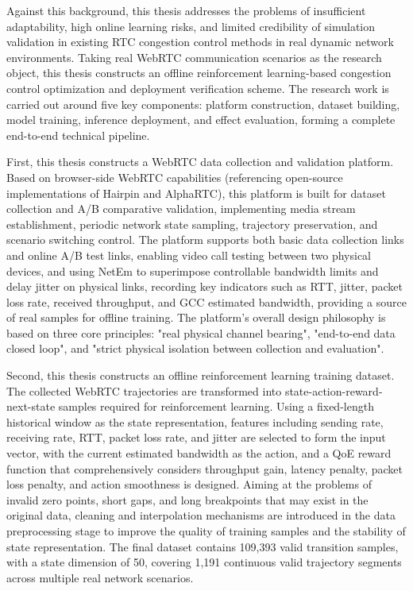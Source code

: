 {Against this background, this thesis addresses the problems of insufficient adaptability, high online learning risks, and limited credibility of simulation validation in existing RTC congestion control methods in real dynamic network environments. Taking real WebRTC communication scenarios as the research object, this thesis constructs an offline reinforcement learning-based congestion control optimization and deployment verification scheme. The research work is carried out around five key components: platform construction, dataset building, model training, inference deployment, and effect evaluation, forming a complete end-to-end technical pipeline.

First, this thesis constructs a WebRTC data collection and validation platform. Based on browser-side WebRTC capabilities (referencing open-source implementations of Hairpin and AlphaRTC), this platform is built for dataset collection and A/B comparative validation, implementing media stream establishment, periodic network state sampling, trajectory preservation, and scenario switching control. The platform supports both basic data collection links and online A/B test links, enabling video call testing between two physical devices, and using NetEm to superimpose controllable bandwidth limits and delay jitter on physical links, recording key indicators such as RTT, jitter, packet loss rate, received throughput, and GCC estimated bandwidth, providing a source of real samples for offline training. The platform's overall design philosophy is based on three core principles: "real physical channel bearing", "end-to-end data closed loop", and "strict physical isolation between collection and evaluation".

Second, this thesis constructs an offline reinforcement learning training dataset. The collected WebRTC trajectories are transformed into state-action-reward-next-state samples required for reinforcement learning. Using a fixed-length historical window as the state representation, features including sending rate, receiving rate, RTT, packet loss rate, and jitter are selected to form the input vector, with the current estimated bandwidth as the action, and a QoE reward function that comprehensively considers throughput gain, latency penalty, packet loss penalty, and action smoothness is designed. Aiming at the problems of invalid zero points, short gaps, and long breakpoints that may exist in the original data, cleaning and interpolation mechanisms are introduced in the data preprocessing stage to improve the quality of training samples and the stability of state representation. The final dataset contains 109,393 valid transition samples, with a state dimension of 50, covering 1,191 continuous valid trajectory segments across multiple real network scenarios.

}
